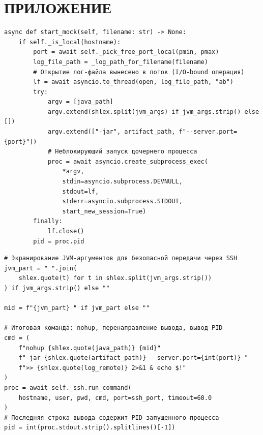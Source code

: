 ﻿
\renewcommand{\thechapter}{\Asbuk{appendixnum}}
\chapter{{\fontsize{14pt}{21pt}\selectfont\MakeUppercase{ПРИЛОЖЕНИЕ \appendixletter}}}
\label{cha:appendix1}

\setcounter{figure}{0}
\setcounter{listing}{0}
\renewcommand{\thefigure}{\appendixletter.\arabic{figure}}
\renewcommand{\thelisting}{\appendixletter.\arabic{listing}}
\renewcommand{\theHlisting}{\appendixletter.\arabic{listing}}

\begin{listing}[H]
\caption{Запуск Java-процесса на локальном хосте}
\label{lst:start-local}
\begin{mdframed}
\begin{verbatim}
async def start_mock(self, filename: str) -> None:
    if self._is_local(hostname):
        port = await self._pick_free_port_local(pmin, pmax)
        log_file_path = _log_path_for_filename(filename)
        # Открытие лог-файла вынесено в поток (I/O-bound операция)
        lf = await asyncio.to_thread(open, log_file_path, "ab")
        try:
            argv = [java_path]
            argv.extend(shlex.split(jvm_args) if jvm_args.strip() else [])
            argv.extend(["-jar", artifact_path, f"--server.port={port}"])
            # Неблокирующий запуск дочернего процесса
            proc = await asyncio.create_subprocess_exec(
                *argv,
                stdin=asyncio.subprocess.DEVNULL,
                stdout=lf,
                stderr=asyncio.subprocess.STDOUT,
                start_new_session=True)
        finally:
            lf.close()
        pid = proc.pid
\end{verbatim}
\end{mdframed}
\end{listing}

\clearpage
\begin{listing}[H]
\caption{Формирование SSH-команды запуска Java-процесса на удалённом хосте}
\label{lst:start-remote}
\begin{mdframed}
\begin{verbatim}
# Экранирование JVM-аргументов для безопасной передачи через SSH
jvm_part = " ".join(
    shlex.quote(t) for t in shlex.split(jvm_args.strip())
) if jvm_args.strip() else ""

mid = f"{jvm_part} " if jvm_part else ""

# Итоговая команда: nohup, перенаправление вывода, вывод PID
cmd = (
    f"nohup {shlex.quote(java_path)} {mid}"
    f"-jar {shlex.quote(artifact_path)} --server.port={int(port)} "
    f">> {shlex.quote(log_remote)} 2>&1 & echo $!"
)
proc = await self._ssh.run_command(
    hostname, user, pwd, cmd, port=ssh_port, timeout=60.0
)
# Последняя строка вывода содержит PID запущенного процесса
pid = int(proc.stdout.strip().splitlines()[-1])
\end{verbatim}
\end{mdframed}
\end{listing}

